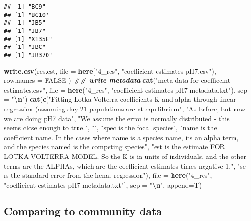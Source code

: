 \documentclass[
]{article}
\newenvironment{Shaded}{\begin{snugshade}}{\end{snugshade}}
\newcommand{\AttributeTok}[1]{\textcolor[rgb]{0.13,0.29,0.53}{#1}}
\newcommand{\ConstantTok}[1]{\textcolor[rgb]{0.56,0.35,0.01}{#1}}
\newcommand{\DocumentationTok}[1]{\textcolor[rgb]{0.56,0.35,0.01}{\textbf{\textit{#1}}}}
\newcommand{\FunctionTok}[1]{\textcolor[rgb]{0.13,0.29,0.53}{\textbf{#1}}}
\newcommand{\NormalTok}[1]{#1}
\newcommand{\SpecialCharTok}[1]{\textcolor[rgb]{0.81,0.36,0.00}{\textbf{#1}}}
\newcommand{\StringTok}[1]{\textcolor[rgb]{0.31,0.60,0.02}{#1}}
\begin{document}
\begin{verbatim}
## [1] "BC9"
## [1] "BC10"
## [1] "JB5"
## [1] "JB7"
## [1] "X135E"
## [1] "JBC"
## [1] "JB370"
\end{verbatim}

\begin{Shaded}
\begin{Highlighting}[]
\FunctionTok{write.csv}\NormalTok{(res.est, }
          \AttributeTok{file =} \FunctionTok{here}\NormalTok{(}\StringTok{"4\_res"}\NormalTok{,}
                      \StringTok{"coefficient{-}estimates{-}pH7.csv"}\NormalTok{),}
          \AttributeTok{row.names =} \ConstantTok{FALSE}
\NormalTok{)}
\DocumentationTok{\#\# write metadata}
\FunctionTok{cat}\NormalTok{(}\StringTok{"meta{-}data for coefficeint{-}estimates.csv"}\NormalTok{,}
    \AttributeTok{file =} \FunctionTok{here}\NormalTok{(}\StringTok{"4\_res"}\NormalTok{, }\StringTok{"coefficient{-}estimates{-}pH7{-}metadata.txt"}\NormalTok{),}
    \AttributeTok{sep =} \StringTok{"}\SpecialCharTok{\textbackslash{}n}\StringTok{"}\NormalTok{)}
\FunctionTok{cat}\NormalTok{(}\FunctionTok{c}\NormalTok{(}\StringTok{"Fitting Lotka{-}Volterra coefficients K and alpha through linear regression (assuming day 21 populations are at equilibrium"}\NormalTok{,}
      \StringTok{"As before, but now we are doing pH7 data"}\NormalTok{,}
      \StringTok{"We assume the error is normally distributed {-} this seems close enough to true."}\NormalTok{,}
      \StringTok{""}\NormalTok{,}
      \StringTok{"spec is the focal species"}\NormalTok{,}
      \StringTok{"name is the coefficient name. In the cases where name is a species name, it\textquotesingle{}s an alpha term, and the species named is the competing species"}\NormalTok{,}
      \StringTok{"est is the estimate FOR LOTKA VOLTERRA MODEL. So the K is in units of individuals, and the other terms are the ALPHAs, which are the coefficient estimates times negative 1."}\NormalTok{,}
      \StringTok{"se is the standard error from the lienar regression"}\NormalTok{),}
    \AttributeTok{file =} \FunctionTok{here}\NormalTok{(}\StringTok{"4\_res"}\NormalTok{, }\StringTok{"coefficient{-}estimates{-}pH7{-}metadata.txt"}\NormalTok{),}
    \AttributeTok{sep =} \StringTok{"}\SpecialCharTok{\textbackslash{}n}\StringTok{"}\NormalTok{,}
    \AttributeTok{append=}\NormalTok{T)}
\end{Highlighting}
\end{Shaded}

\hypertarget{comparing-to-community-data-1}{%
\subsection{Comparing to community
data}\label{comparing-to-community-data-1}}
\end{document}
